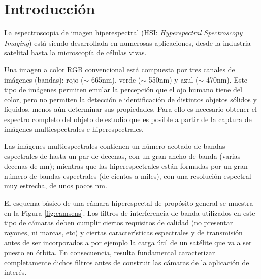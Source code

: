 \documentclass{ctuthesis}
\begin{document}
\section*{Introducción}

\hspace{0.5cm}La espectroscopia de imagen hiperespectral (HSI: 
\textit{Hyperspectral 
Spectroscopy Imaging}) está siendo desarrollada en numerosas aplicaciones, 
desde la industria satelital hasta la microscopía de células vivas.

Una imagen a color RGB convencional está compuesta por tres canales de 
imágenes (bandas): rojo 
($\sim$ 665nm), verde ($\sim$ 550nm) y azul ($\sim$ 470nm). Este tipo de 
imágenes permiten emular la percepción que el ojo humano tiene del color, pero 
no permiten la detección e identificación de distintos objetos sólidos y 
líquidos, menos 
aún determinar sus propiedades. Para ello 
es necesario obtener el espectro completo del objeto de estudio que es posible 
a partir de la captura de imágenes multiespectrales e hiperespectrales.

Las imágenes multiespectrales contienen un número acotado de bandas espectrales 
de hasta un par de decenas, con un gran ancho de banda (varias decenas de nm); 
mientras que las hiperespectrales están formadas por un gran número de bandas 
espectrales (de cientos a miles), con una resolución espectral muy estrecha, de 
unos pocos nm.

El esquema básico de una cámara hiperespectal de propósito general se muestra 
en la Figura \ref{fig:camsens}. Los filtros de interferencia de banda 
utilizados en este tipo de cámaras deben cumplir ciertos requisitos de calidad 
(no presentar rayones, ni marcas, etc) 
y ciertas características espectrales y de transmisión antes de ser 
incorporados a por ejemplo la carga útil de un satélite que va a ser puesto en 
órbita. En consecuencia, resulta fundamental caracterizar completamente dichos 
filtros antes de construir las cámaras de la aplicación de interés.
\end{document}
